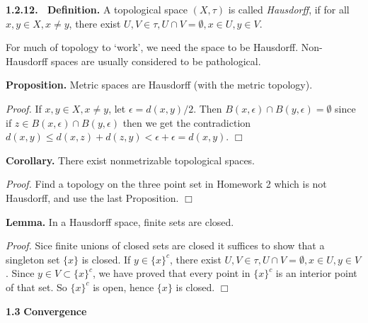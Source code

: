\documentclass[12pt]{article}
\begin{document}
\begin{flushleft}
 { \bf 1.2.12. \ Definition.}  A topological space $(X , \tau)$ is called {\em Hausdorff},
if for all $x,y \in X, x \neq y$, there exist $U, V \in \tau, U \cap V = \emptyset,
x \in U, y \in V$.

For much of topology to `work', we need the space to be Hausdorff.  Non-Hausdorff
spaces are usually considered to be pathological.
\end{flushleft}

\begin{flushleft}

{\bf Proposition.}   Metric spaces are Hausdorff (with the metric topology).

\emph{Proof.  }  If $x,y \in X, x \neq y$, let $\epsilon =
d(x,y)/2$.  Then $B(x,\epsilon) \cap B(y,\epsilon) = \emptyset$
since if $z \in B(x,\epsilon) \cap B(y,\epsilon)$ then  we get the
contradiction $d(x,y) \leq d(x,z) + d(z,y) < \epsilon + \epsilon =
d(x,y) .$   $\Box$
\end{flushleft}

\begin{flushleft}

{\bf Corollary.}  There exist nonmetrizable topological spaces.


\emph{Proof.  }  Find a topology on the three point set in Homework 2 which
is not Hausdorff, and use the last Proposition.
 $\Box$
\end{flushleft}


\begin{flushleft}

{\bf Lemma.}  In a Hausdorff space, finite sets are closed.



\emph{Proof.  }  Sice finite unions of closed sets are closed it
suffices to show that a singleton set $\{ x \}$ is closed.  If $y
\in \{ x \}^c$, there exist $U, V \in \tau, U \cap V = \emptyset, x
\in U, y \in V$.  Since  $y \in V \subset \{ x \}^c$, we have proved
that every point in $\{ x \}^c$ is an interior point of that set. So
$\{ x \}^c$ is open, hence $\{ x \}$ is closed.
 $\Box$
\end{flushleft}

\begin{flushleft}
{\bf 1.3 }{\bf Convergence }
\end{flushleft}
\end{document}
